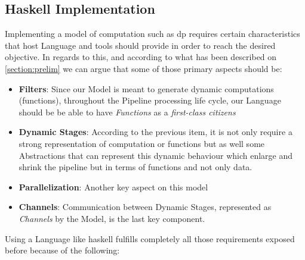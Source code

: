 \documentclass[preprint]{elsarticle}
\begin{document}
\subsection{Haskell Implementation}\label{section:prob:dp:haskell}
Implementing a model of computation such as \acrshort{dp} requires certain characteristics that host Language and tools should provide in order to reach the desired objective. In regards to this, and according to what has been described on \autoref{section:prelim} we can argue that some of those primary aspects should be:

\begin{itemize}
    \item \textbf{Filters}: Since our Model is meant to generate dynamic computations (functions), throughout the Pipeline processing life cycle, our Language should be be able to have \textit{Functions} as a \textit{first-class citizens}
    \item \textbf{Dynamic Stages}: According to the previous item, it is not only require a strong representation of computation or functions but as well some Abstractions that can represent this dynamic behaviour which enlarge and shrink the pipeline but in terms of functions and not only data.
    \item \textbf{Parallelization}: Another key aspect on this model 
    \item \textbf{Channels}: Communication between Dynamic Stages, represented as \textit{Channels} by the Model, is the last key component.
\end{itemize}

Using a Language like \acrshort{haskell} fulfills completely all those requirements exposed before because of the following:
\end{document}
